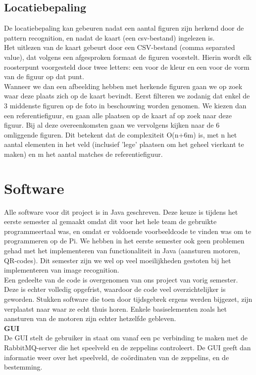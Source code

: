 \documentclass[tt]{penoverslag}
\begin{document}
\subsection{Locatiebepaling}
De locatiebepaling kan gebeuren nadat een aantal figuren zijn herkend door de pattern recognition, en nadat de kaart (een csv-bestand) ingelezen is. \\
Het uitlezen van de kaart gebeurt door een CSV-bestand (comma separated value), dat volgens een afgesproken formaat de figuren voorstelt. Hierin wordt elk roosterpunt voorgesteld door twee letters: een voor de kleur en een voor de vorm van de figuur op dat punt. \\
Wanneer we dan een afbeelding hebben met herkende figuren gaan we op zoek waar deze plaats zich op de kaart bevindt. Eerst filteren we zodanig dat enkel de 3 middenste figuren op de foto in beschouwing worden genomen. We kiezen dan een referentiefiguur, en gaan alle plaatsen op de kaart af op zoek naar deze figuur. Bij al deze overeenkomsten gaan we vervolgens kijken naar de 6 omliggende figuren. Dit betekent dat de complexiteit O(n+6m) is, met n het aantal elementen in het veld (inclusief 'lege' plaatsen om het geheel vierkant te maken) en m het aantal matches de referentiefiguur.

\section{Software}

Alle software voor dit project is in Java geschreven. Deze keuze is tijdens het eerste semester al gemaakt omdat dit voor het hele team de gebruikte programmeertaal was, en omdat er voldoende voorbeeldcode te vinden was om te programmeren op de Pi. We hebben in het eerste semester ook geen problemen gehad met het implementeren van functionaliteit in Java (aansturen motoren, QR-codes). Dit semester zijn we wel op veel moeilijkheden gestoten bij het implementeren van image recognition. \\

Een gedeelte van de code is overgenomen van ons project van vorig semester. Deze is echter volledig opgefrist, waardoor de code veel overzichtelijker is geworden. Stukken software die toen door tijdsgebrek ergens werden bijgezet, zijn verplaatst naar waar ze echt thuis horen. Enkele basiselementen zoals het aansturen van de motoren zijn echter hetzelfde gebleven.\\

\textbf{GUI} \\
De GUI stelt de gebruiker in staat om vanaf een pc verbinding te maken met de RabbitMQ-server die het speelveld en de zeppelins controleert. De GUI geeft dan informatie weer over het speelveld, de co\"{o}rdinaten van de zeppelins, en de bestemming. \\
\end{document}
